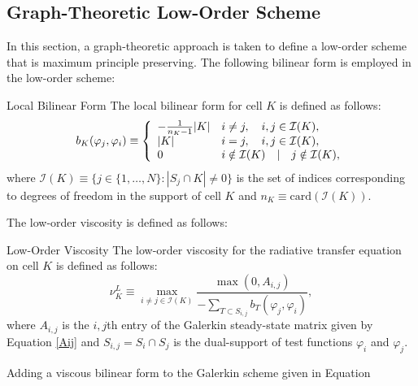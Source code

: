 \subsection{Graph-Theoretic Low-Order Scheme}\label{gtloworder}
In this section, a graph-theoretic approach is taken to define a low-order
scheme that is maximum principle preserving. The following bilinear form
is employed in the low-order scheme:
\begin{definition}{Local Bilinear Form}
   The local bilinear form for cell $K$ is defined as follows:
   \begin{equation}\label{bilinearform}
      b_K(\varphi_j, \varphi_i) \equiv \left\{\begin{array}{l l}
         -\frac{1}{n_K - 1}|K| & i\ne j, \quad i,j\in \mathcal{I}(K),\\
         |K|                   & i = j,  \quad i,j\in \mathcal{I}(K),\\
         0                     & i\notin\mathcal{I}(K) \quad | \quad j\notin\mathcal{I}(K),
      \end{array}\right.
   \end{equation}
   where $\mathcal{I}(K)\equiv \{j\in\{1,\ldots,N\}: |S_j\cap K|\ne 0\}$
   is the set of indices corresponding to degrees of freedom in
   the support of cell $K$ and $n_K \equiv \mbox{card}(\mathcal{I}(K))$.
\end{definition}
The low-order viscosity is defined as follows:
\begin{definition}{Low-Order Viscosity}
   The low-order viscosity for the radiative transfer equation on cell $K$ is
   defined as follows:
   \begin{equation}
      \nu_K^L \equiv \max\limits_{i\ne j\in \mathcal{I}(K)}\frac{\max(0,A_{i,j})}
         {-\sum\limits_{T\subset S_{i,j}} b_T(\varphi_j, \varphi_i)},
   \end{equation}
   where $A_{i,j}$ is the $i,j$th entry of the Galerkin steady-state
   matrix given by Equation \eqref{Aij} and $S_{i,j}=S_i\cap S_j$ is the
   dual-support of test functions $\varphi_i$ and $\varphi_j$.
\end{definition}
Adding a viscous bilinear form to the Galerkin scheme given in Equation
